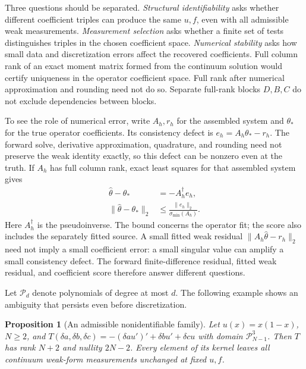 \documentclass{article}
\newcommand{\Poly}{\mathcal{P}}
\newtheorem{proposition}{Proposition}
\begin{document}
Three questions should be separated. \emph{Structural identifiability} asks
whether different coefficient triples can produce the same \(u,f\), even with
all admissible weak measurements. \emph{Measurement selection} asks whether a
finite set of tests distinguishes triples in the chosen coefficient space.
\emph{Numerical stability} asks how small data and discretization errors affect
the recovered coefficients. Full column rank of an exact moment matrix formed
from the continuum solution would certify uniqueness in the operator coefficient space.
Full rank after numerical approximation and rounding need not do so.
Separate full-rank blocks \(D,B,C\) do not exclude dependencies between blocks.

To see the role of numerical error, write \(A_h,r_h\) for the assembled system
and \(\theta_*\) for the true operator coefficients. Its consistency defect is
\(e_h=A_h\theta_*-r_h\). The forward solve, derivative approximation,
quadrature, and rounding need not preserve the weak identity exactly, so this
defect can be nonzero even at the truth. If \(A_h\) has full column rank,
exact least squares for that assembled system gives
\begin{equation}
 \begin{aligned}
 \widehat\theta-\theta_*&=-A_h^\dagger e_h,\\
 \|\widehat\theta-\theta_*\|_2&\le\frac{\|e_h\|_2}{\sigma_{\min}(A_h)}.
 \end{aligned}
 \label{eq:stability}
\end{equation}
Here \(A_h^\dagger\) is the pseudoinverse. The bound concerns the operator
fit; the score also includes the separately fitted source. A small fitted weak
residual \(\|A_h\widehat\theta-r_h\|_2\) need not imply a small coefficient error: a small singular value can amplify a small
consistency defect. The forward finite-difference residual, fitted weak residual,
and coefficient score therefore answer different questions.

Let \(\Poly_d\) denote polynomials of degree at most \(d\). The following
example shows an ambiguity that persists even before discretization.

\begin{proposition}[An admissible nonidentifiable family]
\label{prop:nullity}
Let \(u(x)=x(1-x)\), \(N\ge2\), and
\(T(\delta a,\delta b,\delta c)=-(\delta a u')'+\delta b u'+\delta c u\)
with domain \(\Poly_{N-1}^3\). Then \(T\) has rank \(N+2\) and nullity
\(2N-2\). Every element of its kernel leaves all continuum weak-form
measurements unchanged at fixed \(u,f\).
\end{proposition}
\end{document}
